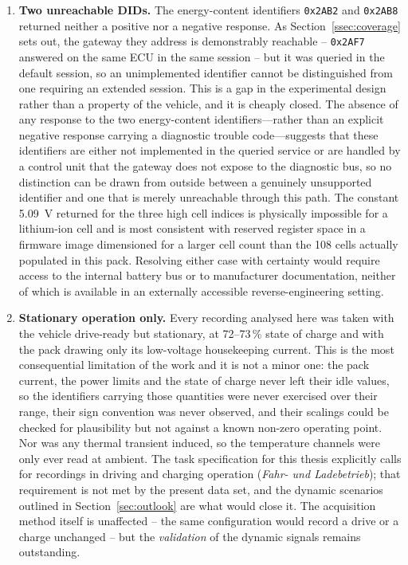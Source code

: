 \documentclass[11pt,a4paper,oneside,parskip=half]{scrreprt}
\providecommand{\hex}{}\renewcommand{\hex}[1]{\texttt{0x#1}}
\begin{document}
\begin{enumerate}
  \item \textbf{Two unreachable DIDs.} The energy-content identifiers \hex{2AB2} and \hex{2AB8} returned neither a positive nor a negative response. As Section~\ref{ssec:coverage} sets out, the gateway they address is demonstrably reachable -- \hex{2AF7} answered on the same ECU in the same session -- but it was queried in the default session, so an unimplemented identifier cannot be distinguished from one requiring an extended session. This is a gap in the experimental design rather than a property of the vehicle, and it is cheaply closed. The absence of any response to the two energy-content identifiers---rather than an explicit negative response carrying a diagnostic trouble code---suggests that these identifiers are either not implemented in the queried service or are handled by a control unit that the gateway does not expose to the diagnostic bus, so no distinction can be drawn from outside between a genuinely unsupported identifier and one that is merely unreachable through this path. The constant 5.09~V returned for the three high cell indices is physically impossible for a lithium-ion cell and is most consistent with reserved register space in a firmware image dimensioned for a larger cell count than the 108 cells actually populated in this pack. Resolving either case with certainty would require access to the internal battery bus or to manufacturer documentation, neither of which is available in an externally accessible reverse-engineering setting.
  \item \textbf{Stationary operation only.} Every recording analysed here was taken with the vehicle drive-ready but stationary, at 72--73\,\% state of charge and with the pack drawing only its low-voltage housekeeping current. This is the most consequential limitation of the work and it is not a minor one: the pack current, the power limits and the state of charge never left their idle values, so the identifiers carrying those quantities were never exercised over their range, their sign convention was never observed, and their scalings could be checked for plausibility but not against a known non-zero operating point. Nor was any thermal transient induced, so the temperature channels were only ever read at ambient. The task specification for this thesis explicitly calls for recordings in driving and charging operation (\emph{Fahr- und Ladebetrieb}); that requirement is not met by the present data set, and the dynamic scenarios outlined in Section~\ref{sec:outlook} are what would close it. The acquisition method itself is unaffected -- the same configuration would record a drive or a charge unchanged -- but the \emph{validation} of the dynamic signals remains outstanding.

\end{enumerate}
\end{document}
